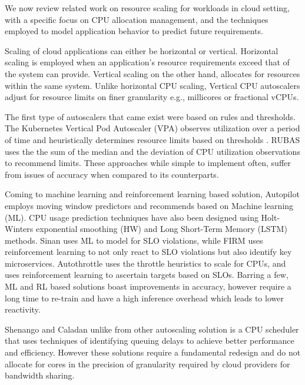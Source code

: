 We now review related work on resource scaling for workloads in cloud setting, with a specific focus on CPU allocation management, and the techniques employed to model application behavior to predict future requirements.

Scaling of cloud applications can either be horizontal or vertical. Horizontal scaling is employed when an application's resource requirements exceed that of the system can provide. Vertical scaling on the other hand, allocates for resources within the same system. Unlike horizontal CPU scaling, Vertical CPU autoscalers adjust for resource limits on finer granularity e.g., millicores or fractional vCPUs.

The first type of autoscalers that came exist were based on rules and thresholds. The Kubernetes Vertical Pod Autoscaler (VPA) observes utilization over a period of time and heuristically determines resource limits based on thresholds \cite{noauthor_kubernetes_nodate}. RUBAS \cite{rattihalli_exploring_2019} uses the the sum of the median and the deviation of CPU utilization observations to recommend limits. These approaches while simple to implement often, suffer from issues of accuracy when compared to its counterparts.

Coming to machine learning and reinforcement learning based solution, Autopilot \cite{rzadca_autopilot_2020} employs moving window predictors and recommends based on Machine learning (ML). CPU usage prediction techniques have also been designed \cite{wang_predicting_2021} using Holt-Winters exponential smoothing (HW) and Long Short-Term Memory (LSTM) methods. Sinan \cite{zhang_sinan_2021} uses ML to model for SLO violations, while FIRM \cite{qiu_firm_nodate} uses reinforcement learning to not only react to SLO violations but also identify key microservices. Autothrottle \cite{wang_autothrottle_2023} uses the throttle heuristics to scale for CPUs, and uses reinforcement learning to ascertain targets based on SLOs. Barring a few, ML and RL based solutions boast improvements in accuracy, however require a long time to re-train and have a high inference overhead which leads to lower reactivity.

Shenango \cite{ousterhout_shenango_2019} and Caladan \cite{fried_caladan_2020} unlike from other autoscaling solution is a CPU scheduler that uses techniques of identifying queuing delays to achieve better performance and efficiency. However these solutions require a fundamental redesign and do not allocate for cores in the precision of granularity required by cloud providers for bandwidth sharing.

